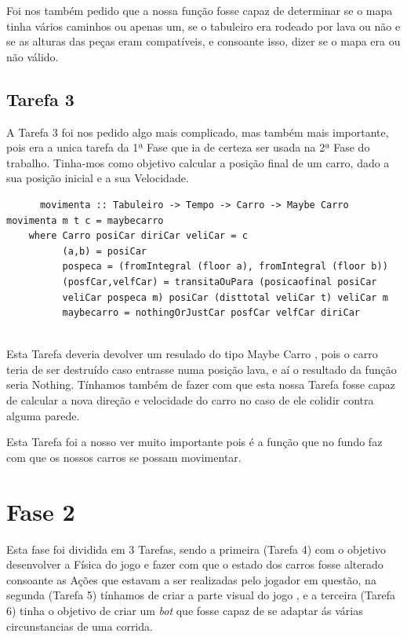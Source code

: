 \documentclass[a4paper]{report} %
\begin{document}
    Foi nos também pedido que a nossa função fosse capaz de determinar se o mapa tinha vários caminhos ou apenas um, se o tabuleiro era rodeado por lava ou não e  se as alturas das peças eram compatíveis, e consoante isso, dizer se o mapa era ou não válido.



\subsection{Tarefa 3}
    A Tarefa 3 foi nos pedido algo mais complicado, mas também mais importante, pois era a unica tarefa da 1ª Fase que ia de certeza ser usada na 2ª Fase do trabalho.
    Tinha-mos como objetivo calcular a posição final de um carro, dado a sua posição inicial e a sua Velocidade.
    
  \begin{verbatim} 
      movimenta :: Tabuleiro -> Tempo -> Carro -> Maybe Carro
movimenta m t c = maybecarro
    where Carro posiCar diriCar veliCar = c
          (a,b) = posiCar 
          pospeca = (fromIntegral (floor a), fromIntegral (floor b))
          (posfCar,velfCar) = transitaOuPara (posicaofinal posiCar 
          veliCar pospeca m) posiCar (disttotal veliCar t) veliCar m
          maybecarro = nothingOrJustCar posfCar velfCar diriCar


\end{verbatim}

     Esta Tarefa deveria devolver um resulado do tipo Maybe Carro , pois o carro teria de ser destruído caso entrasse numa posição lava, e aí o resultado da função seria Nothing.
     Tínhamos também de fazer com que esta nossa Tarefa fosse capaz de calcular a nova direção e velocidade do carro no caso de ele colidir contra alguma parede.
     
     Esta Tarefa foi a nosso ver muito importante pois é a função que no fundo faz com que os nossos carros se possam movimentar.
     
\section{Fase 2}
\label{sec:analisefasee}

\large{Esta fase foi dividida em 3 Tarefas, sendo a primeira (Tarefa 4) com o objetivo desenvolver a Física do jogo e fazer com que o estado dos carros fosse alterado consoante as Ações que estavam  a ser realizadas pelo jogador em questão, na segunda (Tarefa 5) tínhamos de criar a parte visual do jogo , e a terceira (Tarefa 6) tinha o objetivo de criar um \textit{bot} que fosse capaz de se adaptar ás várias circunstancias de uma corrida.}
\end{document}
